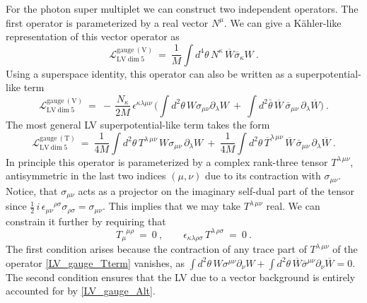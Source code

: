 \documentclass[12pt]{revtex4}
\begin{document}
For the photon super multiplet we can construct two independent
operators. The first operator is parameterized by a real vector
$N^\mu$. We can give a K\"ahler-like representation of this vector
operator as  
\begin{equation}
\label{LV_gauge}
\mathcal{L}_{\mathrm{LV\ dim\ 5}}^{\mathrm{gauge\ (V)}} ~=~ 
\frac 1M \int d^4\theta \, 
N^\kappa\, \overline{W} \bar{\sigma}_\kappa W~.   
\end{equation}
%
Using a superspace identity, this operator can also be written as a
superpotential-like term  
%
\begin{equation}
\label{LV_gauge_Alt}
\mathcal{L}_{\mathrm{LV\ dim\ 5}}^{\mathrm{gauge\ (V)}} ~=~ 
- \, \frac {N_\kappa}{2 M}\,  \epsilon^{\kappa\lambda\mu\nu} \,  
\Big( 
\int d^2\theta\, W \sigma_{\mu\nu} \partial_\lambda W ~+~
\int d^2\bar{\theta}\, \overline{W} \, \bar{\sigma}_{\mu\nu}\, 
\partial_\lambda \overline{W} 
\Big)~.
\end{equation} 
%
The most general LV superpotential-like term takes the form 
\begin{equation}
\label{LV_gauge_Tterm}
\mathcal{L}_{\mathrm{LV\ dim\ 5}}^{\mathrm{gauge\ (T)}} ~=~ 
\frac 1{4M} 
\int d^2\theta \, T^{\lambda\, \mu\nu} \,
        W \sigma_{\mu\nu} \, \partial_\lambda W  
~+~ \frac 1{4M} 
\int d^2\theta \, \overline{T}^{\lambda\, \mu\nu} \,
        \overline{W} \,\bar{\sigma}_{\mu\nu}\, \partial_\lambda\overline{W}  
~.
\end{equation}
%
In principle this operator is parameterized by a complex rank-three
tensor $T^{\lambda\,\mu\nu}$, antisymmetric in the last two indices
$(\mu,\nu)$ due to its contraction with $\sigma_{\mu\nu}$. Notice, that
$\sigma_{\mu\nu}$ acts as a projector on the imaginary self-dual part
of the tensor since 
\(
\frac{1}{2}\,i\,\epsilon_{\mu\nu}{}^{\rho\sigma}
\sigma_{\rho\sigma} = \sigma_{\mu\nu}. 
\)
This implies that we may take $T^{\lambda\,\mu\nu}$ real. We can
constrain it further by requiring that 
%
\begin{equation}
T_\mu^{\phantom{\mu}\mu\rho} ~=~ 0~,
 \qquad 
\epsilon_{\kappa\lambda\rho\sigma}\, T^{\lambda\,\rho\sigma}  ~=~  0~.
\end{equation} 
%
The first condition arises because the contraction of any trace part of
$T^{\lambda\,\mu\nu}$ of the operator \eqref{LV_gauge_Tterm} vanishes, as
\(
\int d^2\theta \, W\sigma^{\mu\nu} \partial_\nu W + 
\int d^2\theta \, \overline{W} \bar\sigma^{\mu\nu} \partial_\nu
\overline{W} = 0. 
\)
The second condition ensures that the LV due to a vector 
background is entirely accounted for by \eqref{LV_gauge_Alt}.
\end{document}
